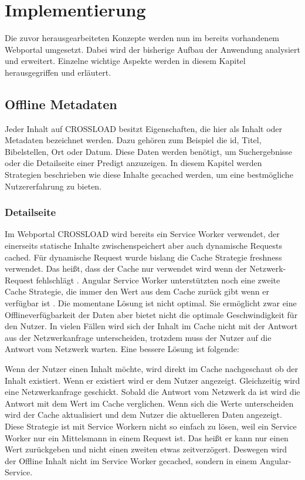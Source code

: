 \chapter{Implementierung}
\label{Kap5}
Die zuvor herausgearbeiteten Konzepte werden nun im bereits vorhandenem Webportal umgesetzt. Dabei wird der bisherige Aufbau der Anwendung analysiert und erweitert. Einzelne wichtige Aspekte werden in diesem Kapitel herausgegriffen und erläutert.

\section{Offline Metadaten}
Jeder Inhalt auf CROSSLOAD besitzt Eigenschaften, die hier als Inhalt oder Metadaten bezeichnet werden. Dazu gehören zum Beispiel die id, Titel, Bibelstellen, Ort oder Datum. Diese Daten werden benötigt, um Suchergebnisse oder die Detailseite einer Predigt anzuzeigen. In diesem Kapitel werden Strategien beschrieben wie diese Inhalte gecached werden, um eine bestmögliche Nutzererfahrung zu bieten.

\subsection{Detailseite}
Im Webportal CROSSLOAD wird bereits ein Service Worker verwendet, der einerseits statische Inhalte zwischenspeichert aber auch dynamische Requests cached. Für dynamische Request wurde bislang die Cache Strategie freshness verwendet. Das heißt, dass der Cache nur verwendet wird wenn der Netzwerk-Request fehlschlägt \autocite{angular-service-worker}. Angular Service Worker unterstützten noch eine zweite Cache Strategie, die immer den Wert aus dem Cache zurück gibt wenn er verfügbar ist \autocite{angular-service-worker}. Die momentane Lösung ist nicht optimal. Sie ermöglicht zwar eine Offlineverfügbarkeit der Daten aber bietet nicht die optimale Geschwindigkeit für den Nutzer. In vielen Fällen wird sich der Inhalt im Cache nicht mit der Antwort aus der Netzwerkanfrage unterscheiden, trotzdem muss der Nutzer auf die Antwort vom Netzwerk warten. Eine bessere Lösung ist folgende:

Wenn der Nutzer einen Inhalt möchte, wird direkt im Cache nachgeschaut ob der Inhalt existiert. Wenn er existiert wird er dem Nutzer angezeigt. Gleichzeitig wird eine Netzwerkanfrage geschickt. Sobald die Antwort vom Netzwerk da ist wird die Antwort mit dem Wert im Cache verglichen. Wenn sich die Werte unterscheiden wird der Cache aktualisiert und dem Nutzer die aktuelleren Daten angezeigt. Diese Strategie ist mit Service Workern nicht so einfach zu lösen, weil ein Service Worker nur ein Mittelsmann in einem Request ist. Das heißt er kann nur einen Wert zurückgeben und nicht einen zweiten etwas zeitverzögert. Deswegen wird der Offline Inhalt nicht im Service Worker gecached, sondern in einem Angular-Service.

